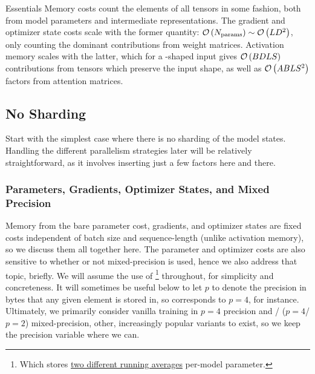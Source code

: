 \documentclass[11pt]{article}
\begin{document}
\begin{nicebox}{Essentials}
	Memory costs count the elements of all tensors in some fashion, both from model parameters and
	intermediate representations. The gradient and optimizer state costs scale with the former quantity:
	$ \mathcal{O} \left ( N _{ {\rm params}  } \right ) \sim \mathcal{O} \left ( L D ^{ 2 } \right )$, only counting
	the dominant contributions from weight matrices. Activation memory scales with the latter,
	which for a -shaped input gives $ \mathcal{O} \left ( BDLS  \right ) $ contributions
	from tensors which preserve the input shape, as well as $ \mathcal{O} \left( ABLS ^{ 2 } \right)  $
	factors from attention matrices.
\end{nicebox}


\subsection{No Sharding}

Start with the simplest case where there is no sharding of the model states. Handling the different
parallelism strategies later will be relatively straightforward, as it involves inserting just a few
factors here and there.

\subsubsection{Parameters, Gradients, Optimizer States, and Mixed Precision
	\label{sec_params_grads_optim_mem}}


Memory from the bare parameter cost, gradients, and optimizer states are fixed costs independent of
batch size and sequence-length (unlike activation memory), so we discuss them all together here. The
parameter and optimizer costs are also sensitive to whether or not mixed-precision is used, hence we
also address that topic, briefly.  We will assume the use of \footnote{Which stores
	\href{https://pytorch.org/docs/stable/generated/torch.optim.Adam.html}{two different running
		averages} per-model parameter.} throughout, for simplicity and concreteness. It will sometimes be
useful below to let $ p $ to denote the precision in bytes that any given element is stored in, so
 corresponds to $ p=4 $, for instance. Ultimately, we primarily consider
vanilla training in $ p=4 $ precision and / ($ p=4
$/ $ p=2 $)  mixed-precision, other, increasingly popular variants to exist, so we keep the
precision variable where we can.
\end{document}
